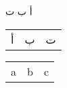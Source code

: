 \documentclass[a4paper]{article}
\begin{document}
أ ب ت

\vspace{1cm}

\begin{tabular}{*{3}c}
أ & ب & ت
\end{tabular}

\vspace{1cm}

\begin{english}

\begin{tabular}{*{3}c}
a & b & c
\end{tabular}

\end{english}
\end{document}

